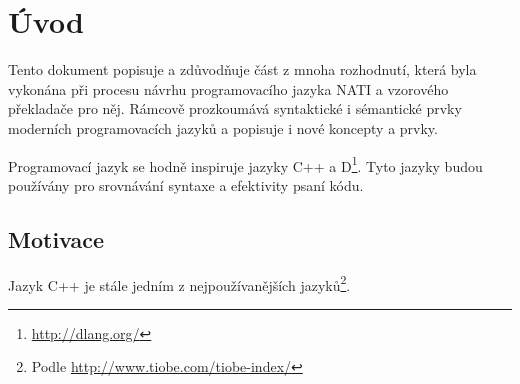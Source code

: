 
\chapter{Úvod}
Tento dokument popisuje a zdůvodňuje část z mnoha rozhodnutí, která byla vykonána při procesu návrhu programovacího jazyka NATI a vzorového překladače pro něj. Rámcově prozkoumává syntaktické i sémantické prvky moderních programovacích jazyků a popisuje i nové koncepty a prvky.

Programovací jazyk se hodně inspiruje jazyky C++ a D\footnote{\url{http://dlang.org/}}. Tyto jazyky budou používány pro srovnávání syntaxe a efektivity psaní kódu.

\section{Motivace}
Jazyk C++ je stále jedním z nejpoužívanějších jazyků\footnote{Podle \url{http://www.tiobe.com/tiobe-index/}}. 

\begin{comment}
Mou hlavní motivací je nespokojenost se stávajícími programovacími jazyky. Programování mám jako koníčka už od nějakých dvanácti let, a tak jsem ještě před nastoupením na FIT získal nějaké zkušenosti z psaní aplikací v Object Pascalu (Delphi), C++ (Qt, SDL + OpenGL) a PHP (webové aplikace). FIT pak můj repertoár (i když jen rámcově) rozšířil na valnou většinu dnes používaných jazyků. Bohužel jsem ale nenarazil na žádný, který by splňoval mé požadavky. Rozhodl jsem se tedy využít nutnost napsání bakalářské práce k~uskutečnění mého dlouholetého snu.

\paragraph{Jazyk D}
Mému srdci nejbližší jazyk, na který jsem ve svém pátrání narazil, byl jazyk D. Jedná se o kompilovaný jazyk vycházející z C++ (binárky jsou do jisté míry kompatibilní) s~velice podobnou syntaxí. Největší rozdíly jsou modulový systém\footnote{\url{http://dlang.org/spec/module.html}} (zdrojový kód je rozdělen do modulů, které se vzájemně, i rekurzivně, importují; odpadá nutnost psát hlavičkové soubory), značně rozšířená funkčnost metaprogramování s šablonami a~rozšířená schopnost vykonávat funkce za doby kompilace.

D mi byl velikou inspirací při navrhování mého jazyka. Bohužel i v D jsem narazil na strop možnosti (ačkoli byl značně výš než třeba v C++), kdy některé věci nešly napsat tak jednoduše, jak bych chtěl. Tento jazyk však dokazuje, že tato bariéra může být mnohem dál. Já ji chci ve svém jazyku ještě více posunout. 
\end{comment}


